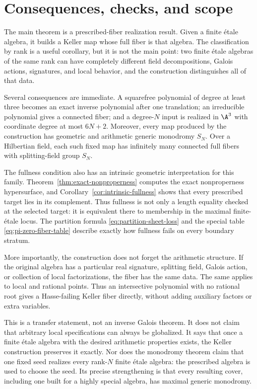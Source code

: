 \section{Consequences, checks, and scope}

The main theorem is a prescribed-fiber realization result.  Given a finite
\'etale algebra, it builds a Keller map whose full fiber is that algebra.  The
classification by rank is a useful corollary, but it is not the main point: two
finite \'etale algebras of the same rank can have completely different field
decompositions, Galois actions, signatures, and local behavior, and the
construction distinguishes all of that data.

Several consequences are immediate.  A squarefree polynomial of degree at
least three becomes an exact inverse polynomial after one translation; an
irreducible polynomial gives a connected fiber; and a degree-$N$ input is
realized in $\A^3$ with coordinate degree at most $6N+2$.  Moreover, every
map produced by the construction has geometric and arithmetic generic
monodromy $S_N$.  Over a Hilbertian field, each such fixed map has infinitely
many connected full fibers with splitting-field group $S_N$.

The fullness condition also has an intrinsic geometric interpretation for
this family.  Theorem~\ref{thm:exact-nonproperness} computes the exact
nonproperness hypersurface, and Corollary~\ref{cor:intrinsic-fullness} shows
that every prescribed target lies in its complement.  Thus fullness is not
only a length equality checked at the selected target: it is equivalent there
to membership in the maximal finite-\'etale locus.  The partition formula
\eqref{eq:partition-sheet-loss} and the special table
\eqref{eq:pi-zero-fiber-table} describe exactly how fullness fails on every
boundary stratum.

More importantly, the construction does not forget the arithmetic structure.
If the original algebra has a particular real signature, splitting field,
Galois action, or collection of local factorizations, the fiber has the same
data.  The same applies to local and rational points.  Thus an intersective
polynomial with no rational root gives a Hasse-failing Keller fiber directly,
without adding auxiliary factors or extra variables.

This is a transfer statement, not an inverse Galois theorem.  It does not claim
that arbitrary local specifications can always be globalized.  It says that
once a finite \'etale algebra with the desired arithmetic properties exists,
the Keller construction preserves it exactly.  Nor does the monodromy theorem
claim that one fixed seed realizes every rank-$N$ finite \'etale algebra: the
prescribed algebra is used to choose the seed.  Its precise strengthening is
that every resulting cover, including one built for a highly special algebra,
has maximal generic monodromy.

